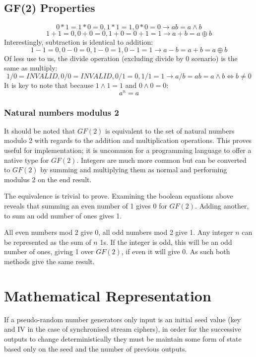 \documentclass{report}
\let\Oldsection\section
\renewcommand{\section}{\FloatBarrier\Oldsection}
\let\Oldsubsection\subsection
\renewcommand{\subsection}{\FloatBarrier\Oldsubsection}
\let\Oldsubsubsection\subsubsection
\renewcommand{\subsubsection}{\FloatBarrier\Oldsubsubsection}
\begin{document}
\subsection{GF(2) Properties}
\begin{equation} \label{eq:GFtimes}
0*1 = 1*0=0, 1*1=1, 0*0=0 \to ab = a \land b
\end{equation}
\begin{equation} \label{eq:GFadd}
1+1=0, 0+0=0, 1+0=0+1=1 \to a+b = a \oplus b
\end{equation}
Interestingly, subtraction is identical to addition:
\begin{equation} \label{eq:GFminus}
1-1=0, 0-0=0, 1-0=1, 0-1=1 \to a-b = a+b = a \oplus b
\end{equation}
Of less use to us, the divide operation (excluding divide by 0 scenario) is the same as multiply:
\begin{equation} \label{eq:GFdivide}
1/0=\mathit{INVALID}, 0/0=\mathit{INVALID}, 0/1=0, 1/1=1 \to a/b = ab = a \land b \iff b \neq 0
\end{equation}
It is key to note that because $1\land1=1$ and $0\land0 = 0$:
\begin{equation} \label{eq:GFpowers}
a^n = a
\end{equation}

\subsubsection{Natural numbers modulus 2}
It should be noted that $\mathit{GF(2)}$ is equivalent to the set of natural numbers modulo 2 with regards to the addition and multiplication operations. This proves useful for implementation; it is uncommon for a programming language to offer a native type for $\mathit{GF(2)}$. Integers are much more common but can be converted to $\mathit{GF(2)}$ by summing and multiplying them as normal and performing modulus 2 on the end result.

The equivalence is trivial to prove. Examining the boolean equations above reveals that summing an even number of 1 gives 0 for $GF(2)$. Adding another, to sum an odd number of ones gives 1.

All even numbers mod 2 give 0, all odd numbers mod 2 give 1. Any integer $n$ can be represented as the sum of $n$ 1s. If the integer is odd, this will be an odd number of ones, giving 1 over $GF(2)$, if even it will give 0. As such both methods give the same result.
\newpage
\section{Mathematical Representation}
If a pseudo-random number generators only input is an initial seed value (key and IV in the case of synchronised stream ciphers), in order for the successive outputs to change deterministically they must be maintain some form of state based only on the seed and the number of previous outputs.
\end{document}
